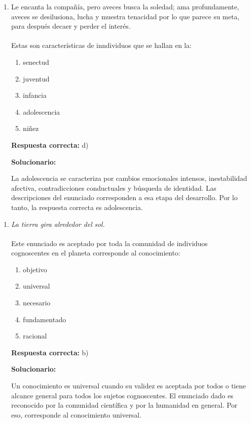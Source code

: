 \begin{enumerate}[resume]
	
	\item Le encanta la compañía, pero aveces busca la soledad; ama profundamente, aveces se desilusiona, lucha y muestra tenacidad por lo que parece su meta, para después decaer y perder el interés.\\\\
	Estas son características de inndividuos que se hallan en la:
	
	
	\begin{enumerate}[label=\alph*)]
		\item senectud
		\item juventud
		\item infancia
		\item adolescencia
		\item niñez
	\end{enumerate}
	
	\textbf{Respuesta correcta:} d)
	
	\vspace{2mm}
	\textbf{Solucionario:}
	
	La adolescencia se caracteriza por cambios emocionales intensos, inestabilidad afectiva, contradicciones conductuales y búsqueda de identidad. Las descripciones del enunciado corresponden a esa etapa del desarrollo. Por lo tanto, la respuesta correcta es adolescencia.
	
\end{enumerate}



\begin{enumerate}[resume]
	
	\item \textit{La tierra gira alrededor del sol.}\\\\
	Este enunciado es aceptado por toda la comunidad de individuos cognoscentes en el planeta corresponde al conocimiento:
	
	
	\begin{enumerate}[label=\alph*)]
		\item objetivo
		\item universal
		\item necesario
		\item fundamentado
		\item racional
	\end{enumerate}
	
	\textbf{Respuesta correcta:} b)
	
	\vspace{2mm}
	\textbf{Solucionario:}
	
	Un conocimiento es universal cuando su validez es aceptada por todos o tiene alcance general para todos los sujetos cognoscentes. El enunciado dado es reconocido por la comunidad científica y por la humanidad en general. Por eso, corresponde al conocimiento universal.
	
\end{enumerate}


